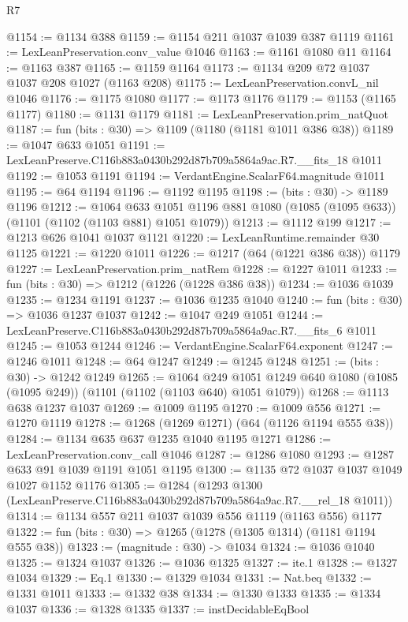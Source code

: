 \begin{lexlean}{R7}
\begin{coremodule}
@1154 := @1134 @388
@1159 := @1154 @211 @1037 @1039 @387 @1119
@1161 := LexLeanPreservation.conv_value @1046
@1163 := @1161 @1080 @11
@1164 := @1163 @387
@1165 := @1159 @1164
@1173 := @1134 @209 @72 @1037 @1037 @208 @1027 (@1163 @208)
@1175 := LexLeanPreservation.convL_nil @1046
@1176 := @1175 @1080
@1177 := @1173 @1176
@1179 := @1153 (@1165 @1177)
@1180 := @1131 @1179
@1181 := LexLeanPreservation.prim_natQuot
@1187 := fun (bits : @30) => @1109 (@1180 (@1181 @1011 @386 @38))
@1189 := @1047 @633 @1051
@1191 := LexLeanPreserve.C116b883a0430b292d87b709a5864a9ac.R7.__fits_18 @1011
@1192 := @1053 @1191
@1194 := VerdantEngine.ScalarF64.magnitude @1011
@1195 := @64 @1194
@1196 := @1192 @1195
@1198 := (bits : @30) -> @1189 @1196
@1212 := @1064
    @633
    @1051
    @1196
    @881
    @1080
    (@1085 (@1095 @633))
    (@1101 (@1102 (@1103 @881) @1051 @1079))
@1213 := @1112 @199
@1217 := @1213 @626 @1041 @1037 @1121
@1220 := LexLeanRuntime.remainder @30 @1125
@1221 := @1220 @1011
@1226 := @1217 (@64 (@1221 @386 @38)) @1179
@1227 := LexLeanPreservation.prim_natRem
@1228 := @1227 @1011
@1233 := fun (bits : @30) => @1212 (@1226 (@1228 @386 @38))
@1234 := @1036 @1039
@1235 := @1234 @1191
@1237 := @1036 @1235 @1040
@1240 := fun (bits : @30) => @1036 @1237 @1037
@1242 := @1047 @249 @1051
@1244 := LexLeanPreserve.C116b883a0430b292d87b709a5864a9ac.R7.__fits_6 @1011
@1245 := @1053 @1244
@1246 := VerdantEngine.ScalarF64.exponent
@1247 := @1246 @1011
@1248 := @64 @1247
@1249 := @1245 @1248
@1251 := (bits : @30) -> @1242 @1249
@1265 := @1064
    @249
    @1051
    @1249
    @640
    @1080
    (@1085 (@1095 @249))
    (@1101 (@1102 (@1103 @640) @1051 @1079))
@1268 := @1113 @638 @1237 @1037
@1269 := @1009 @1195
@1270 := @1009 @556
@1271 := @1270 @1119
@1278 := @1268 (@1269 @1271) (@64 (@1126 @1194 @555 @38))
@1284 := @1134 @635 @637 @1235 @1040 @1195 @1271
@1286 := LexLeanPreservation.conv_call @1046
@1287 := @1286 @1080
@1293 := @1287 @633 @91 @1039 @1191 @1051 @1195
@1300 := @1135 @72 @1037 @1037 @1049 @1027 @1152 @1176
@1305 := @1284 (@1293 @1300 (LexLeanPreserve.C116b883a0430b292d87b709a5864a9ac.R7.__rel_18 @1011))
@1314 := @1134 @557 @211 @1037 @1039 @556 @1119 (@1163 @556) @1177
@1322 := fun (bits : @30) => @1265 (@1278 (@1305 @1314) (@1181 @1194 @555 @38))
@1323 := (magnitude : @30) -> @1034
@1324 := @1036 @1040
@1325 := @1324 @1037
@1326 := @1036 @1325
@1327 := ite.{1}
@1328 := @1327 @1034
@1329 := Eq.{1}
@1330 := @1329 @1034
@1331 := Nat.beq
@1332 := @1331 @1011
@1333 := @1332 @38
@1334 := @1330 @1333
@1335 := @1334 @1037
@1336 := @1328 @1335
@1337 := instDecidableEqBool

\end{coremodule}
\end{lexlean}
